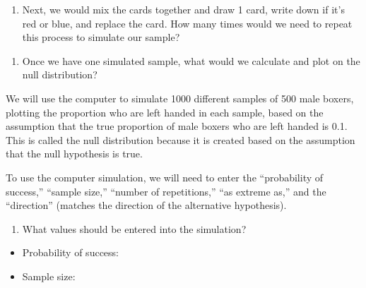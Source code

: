 \documentclass[
]{report}
\providecommand{\tightlist}{%
  \setlength{\itemsep}{0pt}\setlength{\parskip}{0pt}}
\begin{document}
\vspace{0.5in}

\begin{enumerate}
\def\labelenumi{\arabic{enumi}.}
\setcounter{enumi}{15}
\tightlist
\item
  Next, we would mix the cards together and draw 1 card, write down if it's red or blue, and replace the card. How many times would we need to repeat this process to simulate our sample?
\end{enumerate}

\vspace{0.5in}

\begin{enumerate}
\def\labelenumi{\arabic{enumi}.}
\setcounter{enumi}{16}
\tightlist
\item
  Once we have one simulated sample, what would we calculate and plot on the null distribution?
  \vspace{1in}
\end{enumerate}

We will use the computer to simulate 1000 different samples of 500 male boxers, plotting the proportion who are left handed in each sample, based on the assumption that the true proportion of male boxers who are left handed is 0.1. This is called the null distribution because it is created based on the assumption that the null hypothesis is true.

To use the computer simulation, we will need to enter the ``probability of success,'' ``sample size,'' ``number of repetitions,'' ``as extreme as,'' and the ``direction'' (matches the direction of the alternative hypothesis).

\begin{enumerate}
\def\labelenumi{\arabic{enumi}.}
\setcounter{enumi}{17}
\tightlist
\item
  What values should be entered into the simulation?
\end{enumerate}

\vspace{.2in}

\begin{itemize}
\tightlist
\item
  Probability of success:
\end{itemize}

\vspace{.2in}

\begin{itemize}
\tightlist
\item
  Sample size:
\end{itemize}
\end{document}
